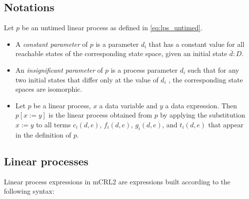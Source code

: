 \documentclass{article}
\begin{document}
\subsection{Notations}

Let $p$ be an untimed linear process as defined in \ref{eq:lps_untimed}.

\begin{itemize}
\item A \emph{constant parameter} of $p$ is a parameter $d_{i}$ that has a
constant value for all reachable states of the corresponding state space,
given an initial state $\overline{d}:D$.

\item An \emph{insignificant parameter} of $p$ is a process parameter $d_{i}$
such that for any two initial states that differ only at the value of $d_{i}$%
, the corresponding state spaces are isomorphic.

\item Let $p$ be a linear process, $x$ a data variable and $y$ a data
expression. Then $p[x:=y]$ is the linear process obtained from $p$ by
applying the substitution $x:=y$ to all terms $c_{i}(d,e)$, $f_{i}(d,e)$, $%
g_{i}(d,e)$, and $t_{i}(d,e)$ that appear in the definition of $p$.
\end{itemize}

\subsection{Linear processes}

Linear process expressions in mCRL2 are expressions built according to the
following syntax:
\end{document}
